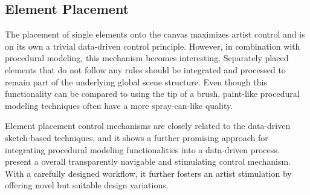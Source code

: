 \subsection{Element Placement}
\label{subsubsec:analysis_creative_means_elements}

The placement of single elements onto the canvas maximizes artist control and is on its own a trivial data-driven control principle. However, in combination with procedural modeling, this mechanism becomes interesting. Separately placed elements that do not follow any rules should be integrated and processed to remain part of the underlying global scene structure. Even though this functionality can be compared to using the tip of a brush, paint-like procedural modeling techniques often have a more spray-can-like quality.


Element placement control mechanisms are closely related to the data-driven sketch-based techniques, and it shows a further promising approach for integrating procedural modeling functionalities into a data-driven process. 
\citeauthor*{guerrero_2016_pep}~\cite{guerrero_2016_pep} present a overall transparently navigable and stimulating control mechanism. With a carefully designed workflow, it further fosters an artist stimulation by offering novel but suitable design variations.

